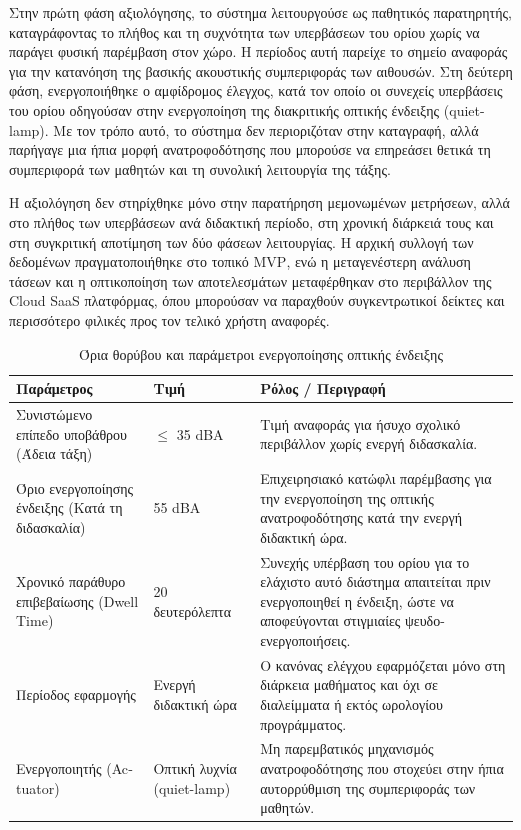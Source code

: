 Στην πρώτη φάση αξιολόγησης, το σύστημα λειτουργούσε ως παθητικός παρατηρητής, καταγράφοντας το πλήθος και τη συχνότητα των υπερβάσεων του ορίου χωρίς να παράγει φυσική παρέμβαση στον χώρο. Η περίοδος αυτή παρείχε το σημείο αναφοράς για την κατανόηση της βασικής ακουστικής συμπεριφοράς των αιθουσών. Στη δεύτερη φάση, ενεργοποιήθηκε ο αμφίδρομος έλεγχος, κατά τον οποίο οι συνεχείς υπερβάσεις του ορίου οδηγούσαν στην ενεργοποίηση της διακριτικής οπτικής ένδειξης (\textlatin{quiet-lamp}). Με τον τρόπο αυτό, το σύστημα δεν περιοριζόταν στην καταγραφή, αλλά παρήγαγε μια ήπια μορφή ανατροφοδότησης που μπορούσε να επηρεάσει θετικά τη συμπεριφορά των μαθητών και τη συνολική λειτουργία της τάξης.

Η αξιολόγηση δεν στηρίχθηκε μόνο στην παρατήρηση μεμονωμένων μετρήσεων, αλλά στο πλήθος των υπερβάσεων ανά διδακτική περίοδο, στη χρονική διάρκειά τους και στη συγκριτική αποτίμηση των δύο φάσεων λειτουργίας. Η αρχική συλλογή των δεδομένων πραγματοποιήθηκε στο τοπικό \textlatin{MVP}, ενώ η μεταγενέστερη ανάλυση τάσεων και η οπτικοποίηση των αποτελεσμάτων μεταφέρθηκαν στο περιβάλλον της \textlatin{Cloud SaaS} πλατφόρμας, όπου μπορούσαν να παραχθούν συγκεντρωτικοί δείκτες και περισσότερο φιλικές προς τον τελικό χρήστη αναφορές.

\begin{table}[htbp]
\centering
\caption{Όρια θορύβου και παράμετροι ενεργοποίησης οπτικής ένδειξης}
\label{tab:noise_limits}
\begin{tabular}{|p{4.8cm}|p{3cm}|p{6.2cm}|}
\hline
\textbf{Παράμετρος} & \textbf{Τιμή} & \textbf{Ρόλος / Περιγραφή} \\
\hline
Συνιστώμενο επίπεδο υποβάθρου (Άδεια τάξη) & $\leq$ 35 \textlatin{dBA} & Τιμή αναφοράς για ήσυχο σχολικό περιβάλλον χωρίς ενεργή διδασκαλία. \\
\hline
Όριο ενεργοποίησης ένδειξης (Κατά τη διδασκαλία) & 55 \textlatin{dBA} & Επιχειρησιακό κατώφλι παρέμβασης για την ενεργοποίηση της οπτικής ανατροφοδότησης κατά την ενεργή διδακτική ώρα. \\
\hline
Χρονικό παράθυρο επιβεβαίωσης (\textlatin{Dwell Time}) & 20 δευτερόλεπτα & Συνεχής υπέρβαση του ορίου για το ελάχιστο αυτό διάστημα απαιτείται πριν ενεργοποιηθεί η ένδειξη, ώστε να αποφεύγονται στιγμιαίες ψευδο-ενεργοποιήσεις. \\
\hline
Περίοδος εφαρμογής & Ενεργή διδακτική ώρα & Ο κανόνας ελέγχου εφαρμόζεται μόνο στη διάρκεια μαθήματος και όχι σε διαλείμματα ή εκτός ωρολογίου προγράμματος. \\
\hline
Ενεργοποιητής (\textlatin{Actuator}) & Οπτική λυχνία (\textlatin{quiet-lamp}) & Μη παρεμβατικός μηχανισμός ανατροφοδότησης που στοχεύει στην ήπια αυτορρύθμιση της συμπεριφοράς των μαθητών. \\
\hline
\end{tabular}
\end{table}

